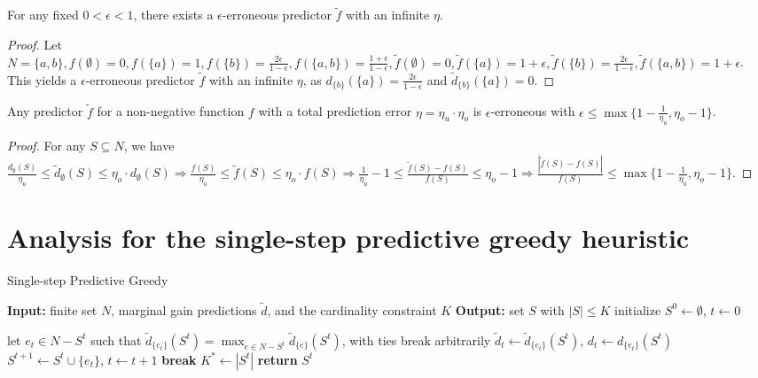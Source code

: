 \begin{lemma} 
For any fixed $0 < \epsilon < 1$, there exists a $\epsilon$-erroneous predictor $\tilde{f}$ with an infinite $\eta$. 
\end{lemma}
\begin{proof}
Let $N = \{a, b\}, f(\emptyset) = 0, f(\{a\}) = 1, f(\{ b \}) = \frac{2\epsilon}{1 - \epsilon}, f(\{ a, b \}) = \frac{1 + \epsilon}{1 - \epsilon}, \tilde{f}(\emptyset) = 0, \tilde{f}(\{ a \}) = 1 + \epsilon, \tilde{f}(\{ b \}) = \frac{2 \epsilon}{1 - \epsilon}, \tilde{f}(\{ a, b \}) = 1 + \epsilon$. This yields a $\epsilon$-erroneous predictor $\tilde{f}$ with an infinite $\eta$, as $d_{\{ b \}}(\{ a \}) = \frac{2 \epsilon}{1 - \epsilon}$ and $\tilde{d}_{\{ b \}}(\{ a \}) = 0$. 
\end{proof}

\begin{lemma} 
Any predictor $\tilde{f}$ for a non-negative function $f$ with a total prediction error $\eta = \eta_u \cdot \eta_o$ is $\epsilon$-erroneous with $\epsilon \leq \max \{ 1 - \frac{1}{\eta_u}, \eta_o - 1 \}$. 
\end{lemma}
\begin{proof}
For any $S \subseteq N$, we have $\frac{d_{\emptyset}(S)}{\eta_u} \leq \tilde{d}_{\emptyset}(S) \leq \eta_o \cdot d_{\emptyset}(S) \Rightarrow \frac{f(S)}{\eta_u} \leq \tilde{f}(S) \leq \eta_o \cdot f(S) \Rightarrow \frac{1}{\eta_u} - 1 \leq \frac{\tilde{f}(S) - f(S)}{f(S)} \leq \eta_o - 1 \Rightarrow \frac{|\tilde{f}(S) - f(S)|}{f(S)} \leq \max \{ 1 - \frac{1}{\eta_u}, \eta_o - 1 \}$.  
\end{proof}


\section{Analysis for the single-step predictive greedy heuristic}

\begin{algorithm}
\caption{Single-step Predictive Greedy} \label{single-step-greedy-algo}
\begin{algorithmic}[1]
\State \textbf{Input:} finite set $N$, marginal gain predictions $\tilde{d}$, and the cardinality constraint $K$
\State \textbf{Output:} set $S$ with $|S| \leq K$
\State initialize $S^0 \gets \emptyset$, $t \gets 0$

    \State let $e_t \in N - S^t$ such that $\tilde{d}_{\{e_t\}}(S^{t}) = \max_{e \in {N - S^t}}{\tilde{d}_{\{e\}}(S^{t})}$, with ties break arbitrarily
    \State $\tilde{d}_{t} \gets \tilde{d}_{\{e_t\}}(S^{t})$, ${d}_{t} \gets {d}_{\{e_t\}}(S^{t})$
        \State $S^{t+1} \gets S^{t} \cup \{ e_t \}$, $t \gets t + 1$ 
    \Else 
        \State \textbf{break} 
    \EndIf 
\EndWhile
\State $K^* \gets |S^{t}|$ 
\State \textbf{return} \( S^{t} \)
\end{algorithmic}
\end{algorithm}

